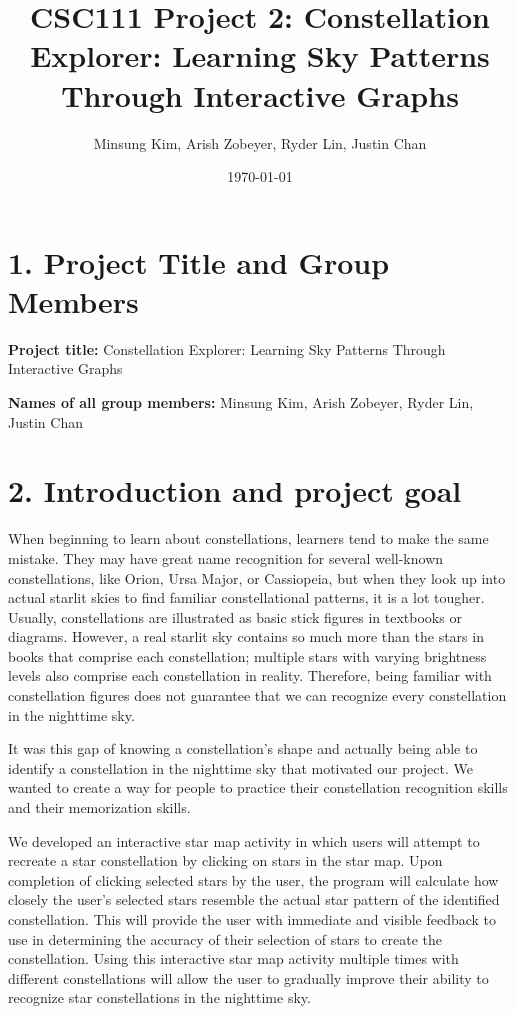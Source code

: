 \documentclass[11pt]{article}
\title{CSC111 Project 2: Constellation Explorer: Learning Sky Patterns Through Interactive Graphs}
\author{Minsung Kim, Arish Zobeyer, Ryder Lin, Justin Chan}
\date{\today}
\begin{document}
\maketitle

\section*{1. Project Title and Group Members}
\textbf{Project title:} Constellation Explorer: Learning Sky Patterns Through Interactive Graphs

\textbf{Names of all group members:} Minsung Kim, Arish Zobeyer, Ryder Lin, Justin Chan

\section*{2. Introduction and project goal}

When beginning to learn about constellations, learners tend to make the same mistake. They may have great name recognition for several well-known constellations, like Orion, Ursa Major, or Cassiopeia, but when they look up into actual starlit skies to find familiar constellational patterns, it is a lot tougher. Usually, constellations are illustrated as basic stick figures in textbooks or diagrams. However, a real starlit sky contains so much more than the stars in books that comprise each constellation; multiple stars with varying brightness levels also comprise each constellation in reality. Therefore, being familiar with constellation figures does not guarantee that we can recognize every constellation in the nighttime sky.

It was this gap of knowing a constellation's shape and actually being able to identify a constellation in the nighttime sky that motivated our project. We wanted to create a way for people to practice their constellation recognition skills and their memorization skills.

We developed an interactive star map activity in which users will attempt to recreate a star constellation by clicking on stars in the star map. Upon completion of clicking selected stars by the user, the program will calculate how closely the user's selected stars resemble the actual star pattern of the identified constellation. This will provide the user with immediate and visible feedback to use in determining the accuracy of their selection of stars to create the constellation. Using this interactive star map activity multiple times with different constellations will allow the user to gradually improve their ability to recognize star constellations in the nighttime sky.
\end{document}
